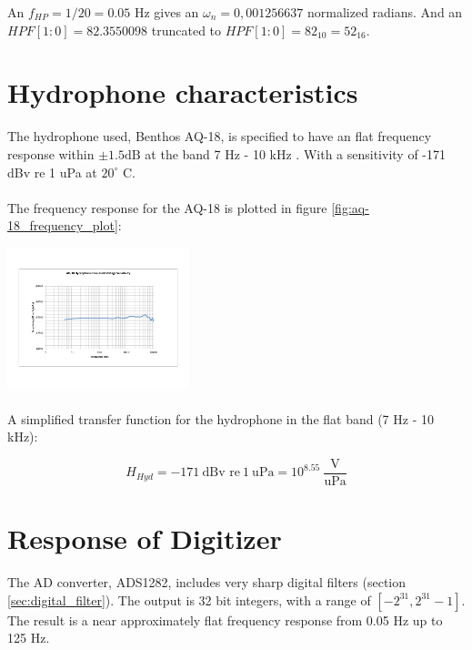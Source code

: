 \documentclass[a4paper]{article}
\begin{document}
\begin{multicols}{2}
An $f_{HP} = 1/20 = 0.05 $ Hz gives an $\omega_n = 0,001256637$ normalized
radians. And an $HPF[1:0] = 82.3550098$ truncated to $HPF[1:0] = 82_{10} =
52_{16}$.

\section{Hydrophone characteristics}
The hydrophone used, Benthos AQ-18, is specified to have an flat frequency response within
$\pm 1.5 \text{dB}$ at the band 7 Hz - 10 kHz
\cite{benthos_hydrophone_brochure}. With a sensitivity of -171 dBv re 1
uPa at $20^\circ$ C.

\paragraph{}
The frequency response for the AQ-18 is plotted in figure
\ref{fig:aq-18_frequency_plot}:

\begin{center}
  \includegraphics[width=200px]{aq-18/AQ-18-FFVS.png}
\end{center}
\label{fig:aq-18_frequency_plot}

\paragraph{}
A simplified transfer function for the hydrophone in the flat band (7
Hz - 10 kHz):

\begin{equation}
  H_{Hyd} = - 171\ \text{dBv re}\ 1\ \text{uPa} = 10^{8.55}
  \ \frac{\text{V}}{\text{uPa}}
  \label{eqn:transfer_hydrophone}
\end{equation}

\section{Response of Digitizer}
The AD converter, ADS1282, includes very sharp digital filters
(section \ref{sec:digital_filter}). The output is 32 bit integers, with
a range of $\left[ -2^{31}, 2^{31} - 1 \right]$. The result is a near
approximately flat frequency response from 0.05 Hz up to 125 Hz.


\end{multicols}
\end{document}
